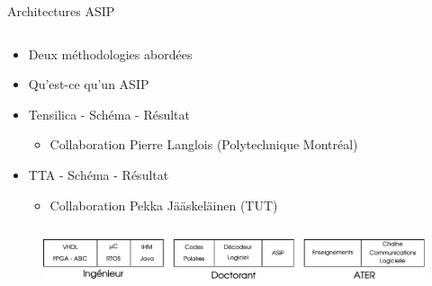 \documentclass[t,compress,mathserif,12pt,xcolor=dvipsnames]{beamer}
\begin{document}
\begin{frame}[t]{Architectures ASIP}
  \begin{minipage}[t][5.0cm][t]{\textwidth}
    \begin{columns}
      \begin{column}{0.63\textwidth}
        \vspace{-30pt}
        \begin{itemize}
          \item Deux méthodologies abordées
          \item Qu'est-ce qu'un ASIP
          \item Tensilica - Schéma - Résultat
          \begin{itemize}
            \item Collaboration Pierre Langlois (Polytechnique Montréal)
          \end{itemize}
          \item TTA - Schéma - Résultat
          \begin{itemize}
            \item Collaboration Pekka Jääskeläinen (TUT)
          \end{itemize}
        \end{itemize}
      \end{column}
      \begin{column}{0.04\textwidth}

      \end{column}
      \begin{column}{0.33\textwidth}
      \end{column}
    \end{columns}
  \end{minipage}
  \begin{figure}[htp]
    \centering
    \includegraphics[width=\textwidth]{fig/frise}
  \end{figure}


\end{frame}
\end{document}
